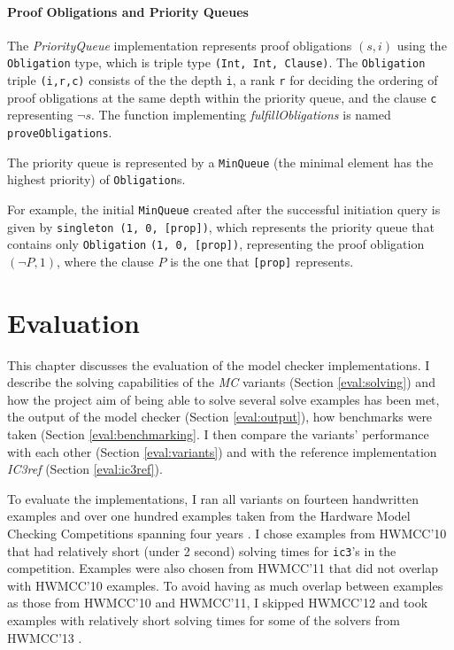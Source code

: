 \documentclass[12pt,a4paper,twoside,openright]{report}
\begin{document}
{\subsubsection{Proof Obligations and Priority Queues}

The {\it PriorityQueue} implementation represents proof obligations $(s,i)$ using the
\verb,Obligation, type, which is triple type \verb.(Int, Int, Clause)..
The \verb,Obligation, triple
\verb.(i,r,c). consists of the the depth \verb,i,, a
rank \verb,r, for deciding the ordering of proof obligations at the same depth within the priority
queue, and the clause \verb,c, representing $\neg s$. The
function implementing {\it fulfillObligations} is named \verb,proveObligations,.

The priority queue is represented by
a \verb,MinQueue, (the minimal element has the highest
priority) of \verb,Obligation,s.

For example, the initial \verb,MinQueue, created after the successful initiation query
is given by \verb.singleton (1, 0, [prop])., which represents the priority queue that
contains only \verb,Obligation, \verb.(1, 0, [prop])., representing the proof obligation
$(\neg P,1)$, where the clause $P$ is the one that \verb,[prop], represents.

\chapter{Evaluation}
\label{eval}

This chapter discusses the evaluation of the model checker implementations.
I describe the solving capabilities of the \emph{MC} variants (Section \ref{eval:solving})
and how the project aim of being able to solve several solve examples has been met,
the output of the model checker (Section \ref{eval:output}), how benchmarks were
taken (Section \ref{eval:benchmarking}. I then compare the variants' performance
with each other (Section \ref{eval:variants}) and with the reference implementation
\emph{IC3ref} (Section \ref{eval:ic3ref}).

To evaluate the implementations, I ran all variants
on fourteen handwritten examples and over one hundred examples taken from
the Hardware Model Checking Competitions spanning four years \cite{hwmcc10, hwmcc11, hwmcc13}.
I chose examples from HWMCC'10 that had relatively short (under 2 second)
solving times for \verb,ic3,'s in the competition.
Examples were also chosen from HWMCC'11 that did not overlap with HWMCC'10 examples.
To avoid having as much overlap between examples as those from HWMCC'10 and HWMCC'11,
I skipped HWMCC'12 and took examples
with relatively short solving times for some of the solvers from HWMCC'13
\cite{hwmcc13}.

}
\end{document}
